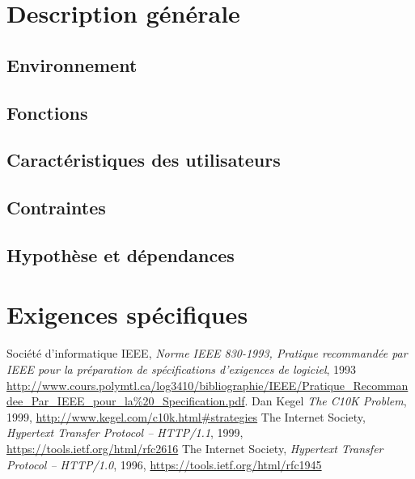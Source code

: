 \documentclass{scrreprt}
\begin{document}
\chapter{Description générale}
\section{Environnement}
\section{Fonctions}
\section{Caractéristiques des utilisateurs}
\section{Contraintes}
\section{Hypothèse et dépendances}
\chapter{Exigences spécifiques}

\begin{thebibliography}{9}
  Société d'informatique IEEE,
  \emph{Norme IEEE 830-1993, Pratique recommandée par IEEE pour la préparation de spécifications d’exigences de logiciel}, 1993 \url{http://www.cours.polymtl.ca/log3410/bibliographie/IEEE/Pratique_Recommandee_Par_IEEE_pour_la%20_Specification.pdf}.
  Dan Kegel
  \emph{The C10K Problem}, 1999, \url{http://www.kegel.com/c10k.html#strategies}
    The Internet Society,
    \emph{Hypertext Transfer Protocol -- HTTP/1.1}, 1999, \url{https://tools.ietf.org/html/rfc2616}
    The Internet Society,
    \emph{Hypertext Transfer Protocol -- HTTP/1.0}, 1996, \url{https://tools.ietf.org/html/rfc1945}
\end{thebibliography}


\end{document}
